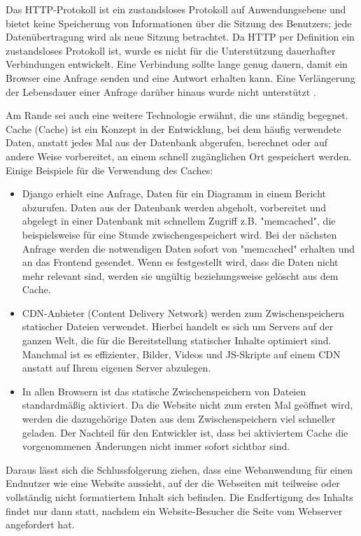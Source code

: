  Das HTTP-Protokoll ist ein zustandsloses Protokoll auf Anwendungsebene und bietet keine Speicherung von Informationen über die Sitzung des Benutzers; jede Datenübertragung wird als neue Sitzung betrachtet. Da HTTP per Definition ein zustandsloses Protokoll ist, wurde es nicht für die Unterstützung dauerhafter Verbindungen entwickelt. Eine Verbindung sollte lange genug dauern, damit ein Browser eine Anfrage senden und eine Antwort erhalten kann. Eine Verlängerung der Lebensdauer einer Anfrage darüber hinaus wurde nicht unterstützt \cite[p.62]{shklar:webapplication}. 

Am Rande sei auch eine weitere Technologie erwähnt, die uns ständig begegnet. Cache (Cache) ist ein Konzept in der Entwicklung, bei dem häufig verwendete Daten, anstatt jedes Mal aus der Datenbank abgerufen, berechnet oder auf andere Weise vorbereitet, an einem schnell zugänglichen Ort gespeichert werden. Einige Beispiele für die Verwendung des Caches:
\begin{itemize}
	\item Django erhielt eine Anfrage, Daten für ein Diagramm in einem Bericht abzurufen. Daten aus der Datenbank werden abgeholt, vorbereitet und abgelegt in einer Datenbank mit schnellem Zugriff z.B. "memcached", die beispielsweise für eine Stunde zwischengespeichert wird. Bei der nächsten Anfrage werden die notwendigen Daten sofort von "memcached" erhalten und an das Frontend gesendet. Wenn es festgestellt wird, dass die Daten nicht mehr relevant sind, werden sie ungültig beziehungsweise gelöscht aus dem Cache.

	\item CDN-Anbieter (Content Delivery Network) werden zum Zwischenspeichern statischer Dateien verwendet. Hierbei handelt es sich um Servers auf der ganzen Welt, die für die Bereitstellung statischer Inhalte optimiert sind. Manchmal ist es effizienter, Bilder, Videos und JS-Skripte auf einem CDN anstatt auf Ihrem eigenen Server abzulegen.

	\item In allen Browsern ist das statische Zwischenspeichern von Dateien standardmäßig aktiviert. Da die Website nicht zum ersten Mal geöffnet wird, werden die dazugehörige Daten aus dem Zwischenspeichern viel schneller geladen. Der Nachteil für den Entwickler ist, dass bei aktiviertem Cache die vorgenommenen Änderungen nicht immer sofort sichtbar sind. 
\end{itemize}

Daraus lässt sich die Schlussfolgerung ziehen, dass eine Webanwendung für einen Endnutzer wie eine Website aussieht, auf der  die Webseiten mit teilweise oder vollständig nicht formatiertem Inhalt sich befinden. Die Endfertigung des Inhalts findet nur dann statt, nachdem ein Website-Besucher die Seite vom Webserver angefordert hat. 

